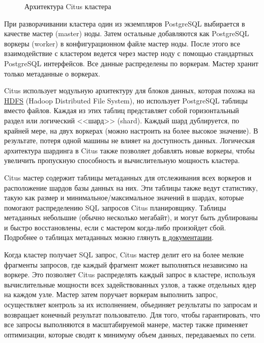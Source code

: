 \begin{figure}[ht!]
  \caption{Архитектура Citus кластера}
  \label{fig:citus_basic_arch}
\end{figure}

При разворачивании кластера один из экземпляров PostgreSQL выбирается в качестве мастер (master) ноды. Затем остальные добавляются как PostgreSQL воркеры (worker) в конфигурационном файле мастер ноды. После этого все взаимодействие с кластером ведется через мастер ноду с помощью стандартных PostgreSQL интерфейсов. Все данные распределены по воркерам. Мастер хранит только метаданные о воркерах.

Citus использует модульную архитектуру для блоков данных, которая похожа на \href{https://ru.wikipedia.org/wiki/Hadoop#HDFS}{HDFS} (Hadoop Distributed File System), но использует PostgreSQL таблицы вместо файлов. Каждая из этих таблиц представляет собой горизонтальный раздел или логический <<шард>> (shard). Каждый шард дублируется, по крайней мере, на двух воркерах (можно настроить на более высокое значение). В результате, потеря одной машины не влияет на доступность данных. Логическая архитектура шардинга в Citus также позволяет добавлять новые воркеры, чтобы увеличить пропускную способность и вычислительную мощность кластера.

Citus мастер содержит таблицы метаданных для отслеживания всех воркеров и расположение шардов базы данных на них. Эти таблицы также ведут статистику, такую как размер и минимальное/максимальное значений в шардах, которые помогают распределению SQL запросов Citus планировщику. Таблицы метаданных небольшие (обычно несколько мегабайт), и могут быть дублированы и быстро восстановлены, если с мастером когда-либо произойдет сбой. Подробнее о таблицах метаданных можно глянуть \href{https://docs.citusdata.com/en/latest/reference/metadata_tables.html}{в документации}.

Когда кластер получает SQL запрос, Citus мастер делит его на более мелкие фрагменты запросов, где каждый фрагмент может выполняться независимо на воркере. Это позволяет Citus распределять каждый запрос в кластере, используя вычислительные мощности всех задействованных узлов, а также отдельных ядер на каждом узле. Мастер затем поручает воркерам выполнить запрос, осуществляет контроль за их исполнением, объединяет результаты по запросам и возвращает конечный результат пользователю. Для того, чтобы гарантировать, что все запросы выполняются в масштабируемой манере, мастер также применяет оптимизации, которые сводят к минимуму объем данных, передаваемых по сети.

